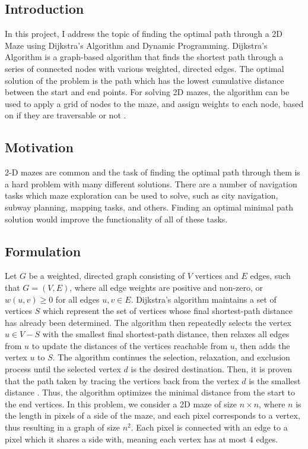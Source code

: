\documentclass[11pt]{article}
\begin{document}
\begin{multicols}{2}
	\section{Introduction}
	In this project, I address the topic of finding the optimal path through a 2D Maze using Dijkstra's Algorithm and
	Dynamic Programming. Dijkstra's Algorithm is a graph-based algorithm that finds the shortest path
	through a series of connected nodes with various weighted, directed edges. The optimal solution of the problem is the
	path which has the lowest cumulative distance between the start and end points.
	For solving 2D mazes, the algorithm can be used to apply a grid of nodes to the maze, and assign
	weights to each node, based on if they are traversable or not \cite{reynolds_python_2020}.

	\subsection{Motivation}
	2-D mazes are common and the task of finding the optimal path through them is a hard problem with many different
	solutions. There are a number of navigation tasks which maze exploration can be used to solve, such
	as city navigation, subway planning, mapping tasks, and others. Finding an optimal minimal path
	solution would improve the functionality of all of these tasks.

	\subsection{Formulation}
	Let ${G}$ be a weighted, directed graph consisting of ${V}$ vertices and ${E}$ edges, such that
	${G=(V,E)}$, where all edge weights are positive and non-zero, or ${w(u, v) \geq 0}$ for all
	edges ${u, v} \in E$. Dijkstra's algorithm maintains a set of vertices ${S}$ which represent
	the set of vertices whose final shortest-path distance has already been determined. The algorithm
	then repeatedly selects the vertex ${u \in V - S}$ with the smallest final shortest-path
	distance, then relaxes all edges from ${u}$ to update the distances of the vertices reachable
	from ${u}$, then adds the vertex ${u}$ to  ${S}$. The algorithm continues the selection,
	relaxation, and exclusion process until the selected vertex ${d}$ is the desired destination.
	Then, it is proven that the path taken by tracing the vertices back from the vertex ${d}$ is the
	smallest distance \cite{cormen_introduction_2009}.	Thus, the algorithm optimizes the minimal
	distance from the start to the end vertices. In this problem, we consider a 2D maze of size ${n
				\times n}$, where ${n}$ is the length in pixels of a side of the maze, and each pixel
	corresponds to a vertex, thus resulting in a graph of size ${n^2}$. Each pixel is connected with
	an edge to a pixel which it shares a side with, meaning each vertex has at most 4 edges.


\end{multicols}
\end{document}
